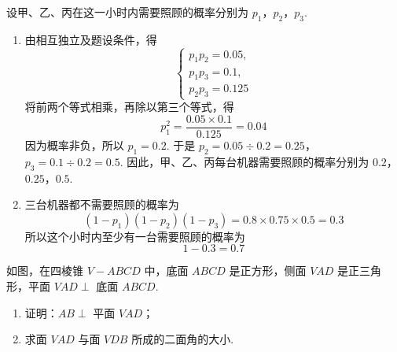 \begin{solution}
设甲、乙、丙在这一小时内需要照顾的概率分别为 \(p_{1}\)，\(p_{2}\)，\(p_{3}\).

\begin{enumerate}
\item 由相互独立及题设条件，得
\[
\begin{cases}
p_{1}p_{2}=0.05,\\
p_{1}p_{3}=0.1,\\
p_{2}p_{3}=0.125
\end{cases}
\]
将前两个等式相乘，再除以第三个等式，得
\[
p_{1}^{2}=\frac{0.05\times0.1}{0.125}=0.04
\]
因为概率非负，所以 \(p_{1}=0.2\). 于是 \(p_{2}=0.05\div0.2=0.25\)，\(p_{3}=0.1\div0.2=0.5\).
因此，甲、乙、丙每台机器需要照顾的概率分别为 \(0.2\)，\(0.25\)，\(0.5\).

\item 三台机器都不需要照顾的概率为
\[
(1-p_{1})(1-p_{2})(1-p_{3})=0.8\times0.75\times0.5=0.3
\]
所以这个小时内至少有一台需要照顾的概率为
\[
1-0.3=0.7
\]
\end{enumerate}
\end{solution}

\begin{problem}
如图，在四棱锥 \(V - ABCD\) 中，底面 \(ABCD\) 是正方形，侧面 \(VAD\) 是正三角形，平面 \(VAD \perp\) 底面 \(ABCD\).

\begin{enumerate}
\item 证明：\(AB \perp\) 平面 \(VAD\)；

\item 求面 \(VAD\) 与面 \(VDB\) 所成的二面角的大小.
\end{enumerate}


{\tallpagetrue
{}
}
\end{problem}

